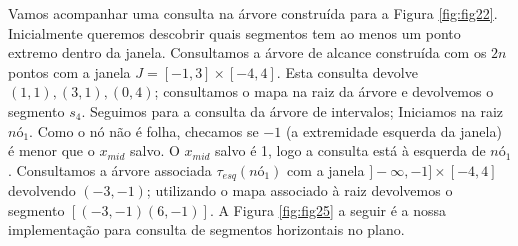 Vamos acompanhar uma consulta na árvore construída para a Figura \ref{fig:fig22}. Inicialmente queremos descobrir quais segmentos tem ao menos um ponto extremo dentro da janela. Consultamos a árvore de alcance construída com os $2n$ pontos com a janela $J=[-1,3]\times[-4,4]$. Esta consulta devolve $(1,1), (3,1), (0,4)$; consultamos o mapa na raiz da árvore e devolvemos o segmento  $s_4$. Seguimos para a consulta da árvore de intervalos; Iniciamos na raiz $nó_1$. Como o nó não é folha, checamos se $-1$ (a extremidade esquerda da janela) é menor que o $x_{mid}$ salvo. O $x_{mid}$ salvo é 1, logo a consulta está à esquerda de $nó_1$. Consultamos a árvore associada $\tau_{esq}(nó_1)$ com a janela  $]-\infty, -1] \times [-4, 4]$ devolvendo $(-3, -1)$; utilizando o mapa associado à raiz devolvemos o segmento $[(-3,-1)(6,-1)]$.
A Figura \ref{fig:fig25} a seguir é a nossa implementação para consulta de segmentos horizontais no plano.

